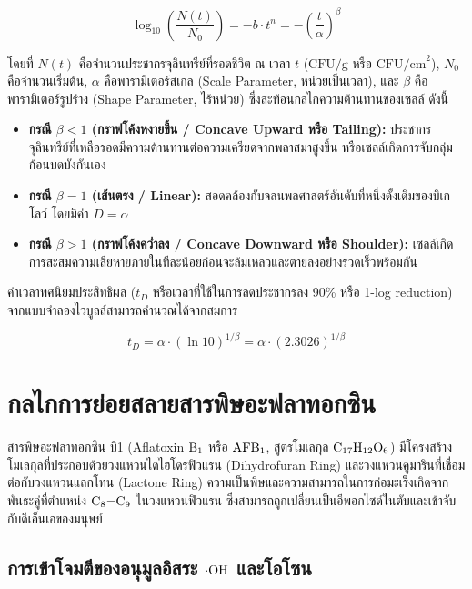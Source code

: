 \begin{equation}
    \log_{10} \left( \frac{N(t)}{N_0} \right) = -b \cdot t^n = - \left( \frac{t}{\alpha} \right)^\beta
    \label{eq:weibull_model}
\end{equation}

โดยที่ $N(t)$ คือจำนวนประชากรจุลินทรีย์ที่รอดชีวิต ณ เวลา $t$ ($\text{CFU/g}$ หรือ $\text{CFU/cm}^2$), $N_0$ คือจำนวนเริ่มต้น, $\alpha$ คือพารามิเตอร์สเกล (Scale Parameter, หน่วยเป็นเวลา), และ $\beta$ คือพารามิเตอร์รูปร่าง (Shape Parameter, ไร้หน่วย) ซึ่งสะท้อนกลไกความต้านทานของเซลล์ ดังนี้
\begin{itemize}
    \item \textbf{กรณี $\beta < 1$ (กราฟโค้งหงายขึ้น / Concave Upward หรือ Tailing):} ประชากรจุลินทรีย์ที่เหลือรอดมีความต้านทานต่อความเครียดจากพลาสมาสูงขึ้น หรือเซลล์เกิดการจับกลุ่มก้อนบดบังกันเอง
    \item \textbf{กรณี $\beta = 1$ (เส้นตรง / Linear):} สอดคล้องกับจลนพลศาสตร์อันดับที่หนึ่งดั้งเดิมของบิเกโลว์ โดยมีค่า $D = \alpha$
    \item \textbf{กรณี $\beta > 1$ (กราฟโค้งคว่ำลง / Concave Downward หรือ Shoulder):} เซลล์เกิดการสะสมความเสียหายภายในทีละน้อยก่อนจะล้มเหลวและตายลงอย่างรวดเร็วพร้อมกัน
\end{itemize}

ค่าเวลาทศนิยมประสิทธิผล ($t_D$ หรือเวลาที่ใช้ในการลดประชากรลง 90\% หรือ 1-log reduction) จากแบบจำลองไวบูลล์สามารถคำนวณได้จากสมการ

\begin{equation}
    t_D = \alpha \cdot \left( \ln 10 \right)^{1/\beta} = \alpha \cdot (2.3026)^{1/\beta}
    \label{eq:weibull_td}
\end{equation}

\section{กลไกการย่อยสลายสารพิษอะฟลาทอกซิน}

สารพิษอะฟลาทอกซิน บี1 (Aflatoxin $\ce{B1}$ หรือ $\ce{AFB1}$, สูตรโมเลกุล $\ce{C17H12O6}$) มีโครงสร้างโมเลกุลที่ประกอบด้วยวงแหวนไดไฮโดรฟิวแรน (Dihydrofuran Ring) และวงแหวนคูมารินที่เชื่อมต่อกับวงแหวนแลกโทน (Lactone Ring) ความเป็นพิษและความสามารถในการก่อมะเร็งเกิดจากพันธะคู่ที่ตำแหน่ง $\ce{C8=C9}$ ในวงแหวนฟิวแรน ซึ่งสามารถถูกเปลี่ยนเป็นอีพอกไซด์ในตับและเข้าจับกับดีเอ็นเอของมนุษย์

\subsection{การเข้าโจมตีของอนุมูลอิสระ $\cdot\ce{OH}$ และโอโซน}

